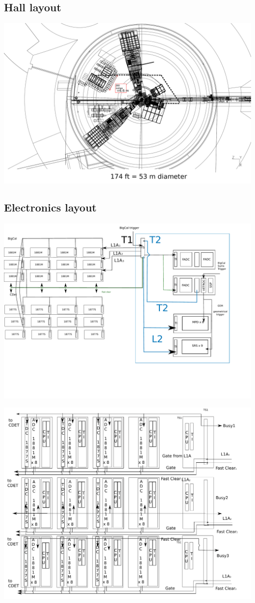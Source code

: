 \documentclass{article}
\begin{document}
\subsection{Hall layout}
\includegraphics[scale=0.3]{figs/cablesHall.pdf}
 \subsection {Electronics layout}
 \includegraphics[scale=0.4]{figs/SBSlayout.pdf}

 \includegraphics[scale=0.4]{figs/FastbusEcalDetailed.pdf}
\end{document}
